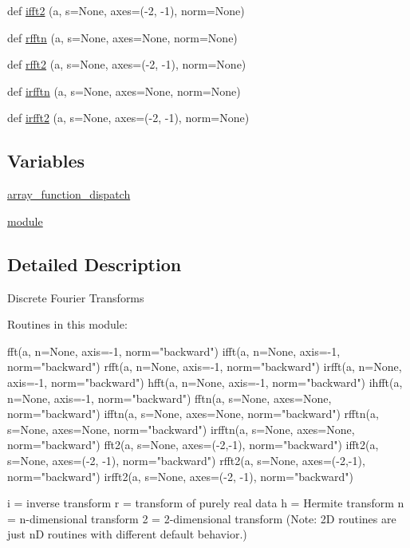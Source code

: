 \begin{DoxyCompactItemize}
def \hyperlink{namespacenumpy_1_1fft_1_1__pocketfft_aa91edeeab7af5c6fadaeafa34a8c37e6}{ifft2} (a, s=None, axes=(-\/2, -\/1), norm=None)
\item 
def \hyperlink{namespacenumpy_1_1fft_1_1__pocketfft_a921c321f6cc9f4ca23fdf9549c24f0ad}{rfftn} (a, s=None, axes=None, norm=None)
\item 
def \hyperlink{namespacenumpy_1_1fft_1_1__pocketfft_a30c7c6357776ec008e22aee5f2996d1c}{rfft2} (a, s=None, axes=(-\/2, -\/1), norm=None)
\item 
def \hyperlink{namespacenumpy_1_1fft_1_1__pocketfft_a4aa141628960f3642f1e7e3c92b391db}{irfftn} (a, s=None, axes=None, norm=None)
\item 
def \hyperlink{namespacenumpy_1_1fft_1_1__pocketfft_aedab7d4f19bc30b2168d69a87f81925a}{irfft2} (a, s=None, axes=(-\/2, -\/1), norm=None)
\end{DoxyCompactItemize}
\subsection*{Variables}
\begin{DoxyCompactItemize}
\item 
\hyperlink{namespacenumpy_1_1fft_1_1__pocketfft_ac165d2501f6b926b97841274eec90812}{array\+\_\+function\+\_\+dispatch}
\item 
\hyperlink{namespacenumpy_1_1fft_1_1__pocketfft_a3d0e5a4fab5b50fbcd79afd4913d1fa2}{module}
\end{DoxyCompactItemize}


\subsection{Detailed Description}
\begin{DoxyVerb}Discrete Fourier Transforms

Routines in this module:

fft(a, n=None, axis=-1, norm="backward")
ifft(a, n=None, axis=-1, norm="backward")
rfft(a, n=None, axis=-1, norm="backward")
irfft(a, n=None, axis=-1, norm="backward")
hfft(a, n=None, axis=-1, norm="backward")
ihfft(a, n=None, axis=-1, norm="backward")
fftn(a, s=None, axes=None, norm="backward")
ifftn(a, s=None, axes=None, norm="backward")
rfftn(a, s=None, axes=None, norm="backward")
irfftn(a, s=None, axes=None, norm="backward")
fft2(a, s=None, axes=(-2,-1), norm="backward")
ifft2(a, s=None, axes=(-2, -1), norm="backward")
rfft2(a, s=None, axes=(-2,-1), norm="backward")
irfft2(a, s=None, axes=(-2, -1), norm="backward")

i = inverse transform
r = transform of purely real data
h = Hermite transform
n = n-dimensional transform
2 = 2-dimensional transform
(Note: 2D routines are just nD routines with different default
behavior.)\end{DoxyVerb}
 

